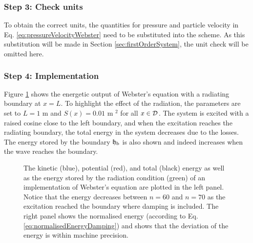 {\subsubsection{Step 3: Check units}
To obtain the correct units, the quantities for pressure and particle velocity in Eq. \eqref{eq:pressureVelocityWebster} need to be substituted into the scheme. As this substitution will be made in Section \ref{sec:firstOrderSystem}, the unit check will be omitted here. 

\subsubsection{Step 4: Implementation}
Figure \ref{fig:energyWebsters} shows the energetic output of Webster's equation with a radiating boundary at $x=L$. To highlight the effect of the radiation, the parameters are set to $L = 1$ m and $S(x) = 0.01$ m $^2$ for all $x\in \mathcal{D}$.  The system is excited with a raised cosine close to the left boundary, and when the excitation reaches the radiating boundary, the total energy in the system decreases due to the losses. The energy stored by the boundary $\mathfrak{h}_\text{b}$ is also shown and indeed increases when the wave reaches the boundary.
\begin{figure}[h]
    \centering
      \caption{The kinetic (blue), potential (red), and total (black) energy as well as the energy stored by the radiation condition (green) of an implementation of Webster's equation are plotted in the left panel. Notice that the energy decreases between $n=60$ and $n=70$ as the excitation reached the boundary where damping is included. The right panel shows the normalised energy (according to Eq. \eqref{eq:normalisedEnergyDamping}) and shows that the deviation of the energy is within machine precision. \label{fig:energyWebsters}}
\end{figure}

}

